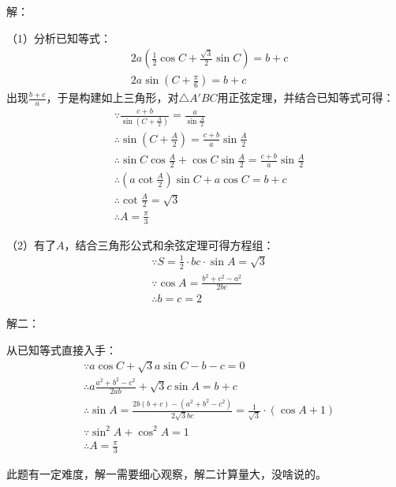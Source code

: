 解：

（1）分析已知等式：
\begin{align*}
&2a\left( \frac{1}{2}\cos C+\frac{\sqrt{3}}{2}\sin C \right) =b+c \\
&2a\sin \left( C+\frac{\pi}{6} \right) =b+c
\end{align*}
出现$\frac{b+c}{a}$，于是构建如上三角形，对$\bigtriangleup A'BC$用正弦定理，并结合已知等式可得：
\begin{align*}
&\because \frac{c+b}{\sin \left( C+\frac{A}{2} \right)}=\frac{a}{\sin \frac{A}{2}} \\
&\therefore \sin \left( C+\frac{A}{2} \right) =\frac{c+b}{a}\sin \frac{A}{2} \\
&\therefore \sin C\cos \frac{A}{2}+\cos C\sin \frac{A}{2}=\frac{c+b}{a}\sin \frac{A}{2} \\
&\therefore \left( a\cot \frac{A}{2} \right) \sin C+a\cos C=b+c \\
&\therefore \cot \frac{A}{2}=\sqrt{3} \\
&\therefore A=\frac{\pi}{3}
\end{align*}

（2）有了$A$，结合三角形公式和余弦定理可得方程组：
\begin{align*}
&\because S=\frac{1}{2}\cdot bc\cdot \sin A=\sqrt{3} \\
&\because \cos A=\frac{b^2+c^2-a^2}{2bc} \\
&\therefore b=c=2
\end{align*}

解二：

从已知等式直接入手：
\begin{align*}
&\because a\cos C+\sqrt{3}a\sin C-b-c=0 \\
&\therefore a\frac{a^2+b^2-c^2}{2ab}+\sqrt{3}c\sin A=b+c \\
&\therefore \sin A=\frac{2b\left( b+c \right) -\left( a^2+b^2-c^2 \right)}{2\sqrt{3}bc}=\frac{1}{\sqrt{3}}\cdot \left( \cos A+1 \right) \\
&\because \sin ^2A+\cos ^2A=1 \\
&\therefore A=\frac{\pi}{3}
\end{align*}

\begin{tcolorbox}
此题有一定难度，解一需要细心观察，解二计算量大，没啥说的。
\end{tcolorbox}




